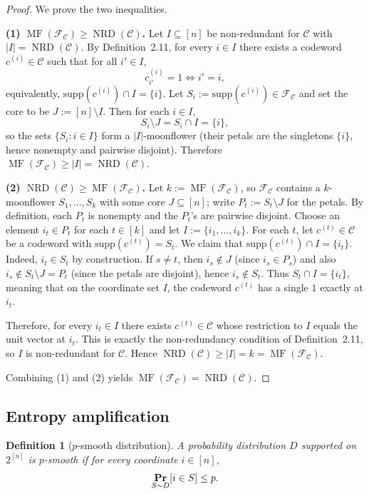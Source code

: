 \documentclass{article}
\newtheorem{definition}[definition]{Definition}
\DeclareMathOperator{\NRD}{NRD}
\DeclareMathOperator{\MF}{MF}
\renewcommand{\Pr}{\mathop{\bf Pr\/}}
\newcommand{\<}{\langle}
\renewcommand{\>}{\rangle}
\newcommand{\calC}{\mathcal{C}}
\newcommand{\supp}{\mathrm{supp}}
\begin{document}
\begin{proof}
We prove the two inequalities.

\smallskip
\noindent\textbf{(1) $\MF(\mathcal F_{\calC})\ge \NRD(\calC)$.}
Let $I\subseteq[n]$ be non-redundant for $\calC$ with $|I|=\NRD(\calC)$. By Definition~2.11, for every $i\in I$
there exists a codeword $c^{(i)}\in \calC$ such that for all $i'\in I$,
\[
c^{(i)}_{i'}=1 \iff i'=i,
\]
equivalently, $\supp(c^{(i)})\cap I=\{i\}$.
Let $S_i:=\supp(c^{(i)})\in\mathcal F_{\calC}$ and set the core to be $J:=[n]\setminus I$.
Then for each $i\in I$,
\[
S_i\setminus J = S_i\cap I = \{i\},
\]
so the sets $\{S_i:i\in I\}$ form a $|I|$-moonflower (their petals are the singletons $\{i\}$, hence
nonempty and pairwise disjoint). Therefore $\MF(\mathcal F_{\calC})\ge |I|=\NRD(\calC)$.

\smallskip
\noindent\textbf{(2) $\NRD(\calC)\ge \MF(\mathcal F_{\calC})$.}
Let $k:=\MF(\mathcal F_{\calC})$, so $\mathcal F_{\calC}$ contains a $k$-moonflower
$S_1,\dots,S_k$ with some core $J\subseteq[n]$; write $P_t:=S_t\setminus J$ for the petals.
By definition, each $P_t$ is nonempty and the $P_t$'s are pairwise disjoint.
Choose an element $i_t\in P_t$ for each $t\in[k]$ and let $I:=\{i_1,\dots,i_k\}$.
For each $t$, let $c^{(t)}\in \calC$ be a codeword with $\supp(c^{(t)})=S_t$.
We claim that $\supp(c^{(t)})\cap I=\{i_t\}$.
Indeed, $i_t\in S_t$ by construction. If $s\neq t$, then $i_s\notin J$ (since $i_s\in P_s$) and
also $i_s\notin S_t\setminus J=P_t$ (since the petals are disjoint), hence $i_s\notin S_t$.
Thus $S_t\cap I=\{i_t\}$, meaning that on the coordinate set $I$, the codeword $c^{(t)}$ has a single
$1$ exactly at $i_t$.

Therefore, for every $i_t\in I$ there exists $c^{(t)}\in \calC$ whose restriction to $I$ equals the unit vector
at $i_t$. This is exactly the non-redundancy condition of Definition~2.11, so $I$ is non-redundant for $\calC$.
Hence $\NRD(\calC)\ge |I|=k=\MF(\mathcal F_{\calC})$.

Combining (1) and (2) yields $\MF(\mathcal F_{\calC})=\NRD(\calC)$.
\end{proof}

\subsection{Entropy amplification}

\begin{definition}[$p$-smooth distribution]
     A probability distribution $D$ supported on $2^{[n]}$ is \emph{$p$-smooth} if for every coordinate $i \in [n]$,
    \[
    \Pr_{S \sim D}[i \in S] \leq p.
    \]
\end{definition}
\end{document}
